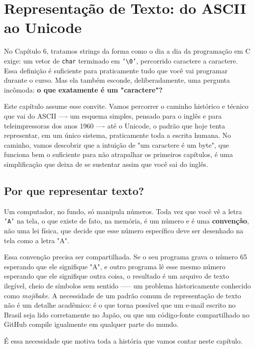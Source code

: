 \chapter*{Representação de Texto: do ASCII ao Unicode}

No Capítulo 6, tratamos strings da forma como o dia a dia da programação em C exige: um vetor de \texttt{char} terminado em \texttt{'\textbackslash 0'}, percorrido caractere a caractere. Essa definição é suficiente para praticamente tudo que você vai programar durante o curso. Mas ela também esconde, deliberadamente, uma pergunta incômoda: \textbf{o que exatamente é um "caractere"?}

Este capítulo assume esse convite. Vamos percorrer o caminho histórico e técnico que vai do ASCII —- um esquema simples, pensado para o inglês e para teleimpressoras dos anos 1960 —- até o Unicode, o padrão que hoje tenta representar, em um único sistema, praticamente toda a escrita humana. No caminho, vamos descobrir que a intuição de "um caractere é um byte", que funciona bem o suficiente para não atrapalhar os primeiros capítulos, é uma simplificação que deixa de se sustentar assim que você sai do inglês.

\section*{Por que representar texto?}

Um computador, no fundo, só manipula números. Toda vez que você vê a letra \texttt{'A'} na tela, o que existe de fato, na memória, é um número e é uma \textbf{convenção}, não uma lei física, que decide que esse número específico deve ser desenhado na tela como a letra "A".

Essa convenção precisa ser compartilhada. Se o seu programa grava o número 65 esperando que ele signifique "A", e outro programa lê esse mesmo número esperando que ele signifique outra coisa, o resultado é um arquivo de texto ilegível, cheio de símbolos sem sentido —-- um problema historicamente conhecido como \textit{mojibake}. A necessidade de um padrão comum de representação de texto não é um detalhe acadêmico: é o que torna possível que um e-mail escrito no Brasil seja lido corretamente no Japão, ou que um código-fonte compartilhado no GitHub compile igualmente em qualquer parte do mundo.

É essa necessidade que motiva toda a história que vamos contar neste capítulo.

